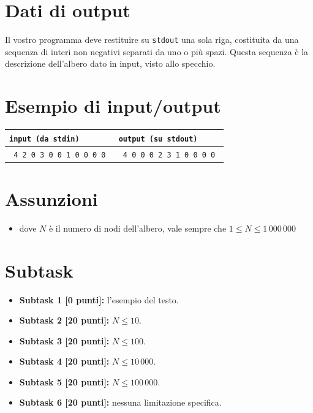 \documentclass[a4paper,11pt]{article}
\newcommand{\file}[1]{\texttt{#1}}
\newcommand{\esempio}[2]{
\noindent\begin{minipage}{\textwidth}
\begin{tabular}{|p{11cm}|p{5cm}|}
	\hline
      \textbf{\file{input (da stdin)}} & \textbf{\file{output (su stdout)}}\\
	\hline
	\tt \small #1 &
	\tt \small #2 \\
	\hline
\end{tabular}
\end{minipage}
}
\begin{document}
\section*{Dati di output}

Il vostro programma deve restituire su \verb'stdout' una sola riga, costituita da una sequenza di interi non negativi separati da uno o pi\`u spazi. Questa sequenza \`e la descrizione dell'albero dato in input, visto allo specchio.

\section*{Esempio di input/output}
\esempio{
4 2 0 3 0 0 1 0 0 0 0
}{
4 0 0 0 2 3 1 0 0 0 0
}

\section*{Assunzioni}
\begin{itemize}[nolistsep, noitemsep]
\item dove $N$ \`e il numero di nodi dell'albero,
      vale sempre che $1 \le N \le 1\,000\,000 $
\end{itemize}

\section*{Subtask}
\begin{itemize}
\item \textbf{Subtask 1 [0 punti]:} l'esempio del testo.
\item \textbf{Subtask 2 [20 punti]:} $N \le 10$.
\item \textbf{Subtask 3 [20 punti]:} $N \le 100$.
\item \textbf{Subtask 4 [20 punti]:} $N \le 10\,000$.
\item \textbf{Subtask 5 [20 punti]:} $N \le 100\,000$.
\item \textbf{Subtask 6 [20 punti]:} nessuna limitazione specifica.
\end{itemize}
\end{document}
